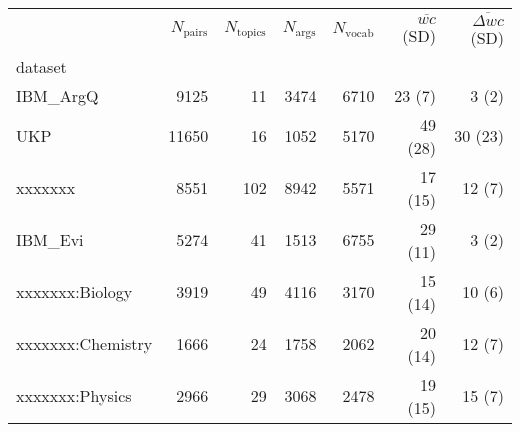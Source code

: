 \newlength{\digitlen}
\settowidth{\digitlen}{0}
\begin{tabular}{lrrrrrr}
\toprule
{} &  $N_{\mathrm{pairs}}$ &  $N_{\mathrm{topics}}$ &  $N_{\mathrm{args}}$  &  $N_{\mathrm{vocab}}$ & 
$\overline{wc}$ (SD) & 
$\overline{\Delta wc}$ (SD)\\
dataset          &          &           &         &        &              &                   \\
\midrule
IBM\_ArgQ         &     9125 &        11 &    3474 &   6710 &       23 (\hspace{\digitlen}7) &             3 (\hspace{\digitlen}2) \\
UKP              &    11650 &        16 &    1052 &   5170 &      49 (28) &           30 (23) \\
xxxxxxx           &     8551 &       102 &    8942 &   5571 &      17 (15) 
&            12 (\hspace{\digitlen}7) \\
IBM\_Evi          &     5274 &        41 &    1513 &   6755 &      29 (11) &             3 (\hspace{\digitlen}2) \\
xxxxxxx:Biology   &     3919 &        49 &    4116 &   3170 &      15 (14) 
&            10 (\hspace{\digitlen}6) \\
xxxxxxx:Chemistry &     1666 &        24 &    1758 &   2062 &      20 (14) 
&            12 (\hspace{\digitlen}7) \\
xxxxxxx:Physics   &     2966 &        29 &    3068 &   2478 &      19 (15) 
&            15 (\hspace{\digitlen}7) \\
\bottomrule
\end{tabular}

